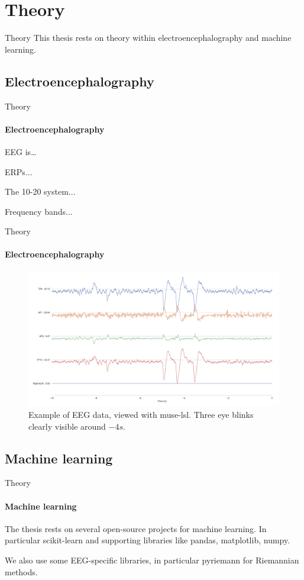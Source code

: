 \documentclass[xcolor={dvipsnames,table},12pt]{beamer}
\newif\ifplacelogo{}  %
\begin{document}
\section{Theory}
\begin{frame}{Theory}
    This thesis rests on theory within electroencephalography and machine learning.
\end{frame}

\subsection{Electroencephalography}
\begin{frame}{Theory}
    \framesubtitle{Electroencephalography}

    EEG is\ldots

    ERPs...

    The 10-20 system...

    Frequency bands...
\end{frame}

\placelogofalse{}
\begin{frame}{Theory}
    \framesubtitle{Electroencephalography}
    \vspace*{-5mm}

    \begin{figure}
        \hspace*{-10mm}
        \includegraphics[width=\paperwidth]{img/muselsl-signal.png}
        \caption{Example of EEG data, viewed with muse-lsl. Three eye blinks clearly visible around $-4s$.}
    \end{figure}
\end{frame}
\placelogotrue{}

\subsection{Machine learning}
\begin{frame}{Theory}
    \framesubtitle{Machine learning}

    The thesis rests on several open-source projects for machine learning. In particular scikit-learn and supporting libraries like pandas, matplotlib, numpy.

    We also use some EEG-specific libraries, in particular pyriemann for Riemannian methods.
\end{frame}
\end{document}
